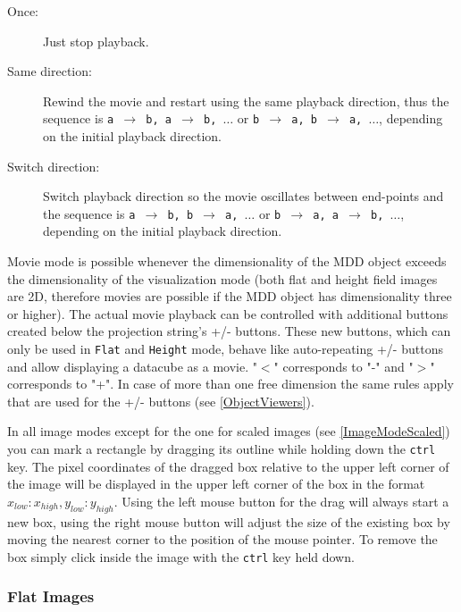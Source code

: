 \documentclass[11pt]{article}
\begin{document}
\begin{description}
\item[Once:] Just stop playback.
\item[Same direction:] Rewind the movie and restart using the same playback direction,
thus the sequence is \texttt{a $\rightarrow$ b, a $\rightarrow$ b, $\ldots$} or
\texttt{b $\rightarrow$ a, b $\rightarrow$ a, $\ldots$}, depending on the initial playback
direction.
\item[Switch direction:] Switch playback direction so the movie oscillates between
end-points and the sequence is \texttt{a $\rightarrow$ b, b $\rightarrow$ a, $\ldots$} or
\texttt{b $\rightarrow$ a, a $\rightarrow$ b, $\ldots$}, depending on the initial playback
direction.
\end{description}

Movie mode is possible whenever the dimensionality of the MDD object exceeds the
dimensionality of the visualization mode (both flat and height field images are 2D,
therefore movies are possible if the MDD object has dimensionality three or higher).
The actual movie playback can be controlled with additional buttons created below
the projection string's +/- buttons. These new buttons,
which can only be used in \texttt{Flat} and \texttt{Height} mode, behave like auto-repeating
+/- buttons and allow displaying a datacube as a movie. "$<$" corresponds to "-"
and "$>$" corresponds to "+". In case of more than one free dimension the same
rules apply that are used for the +/- buttons (see \ref{ObjectViewers}).

In all image modes except for the one for scaled images (see \ref{ImageModeScaled}) you
can mark a rectangle by dragging its outline while holding down the \texttt{ctrl} key.
The pixel coordinates of the dragged box relative to the upper left corner of the image
will be displayed in the upper left corner of the box in the format
$x_{low}:x_{high}, y_{low}:y_{high}$. Using the left mouse button for the
drag will always start a new box, using the right mouse button will adjust the size of
the existing box by moving the nearest corner to the position of the mouse pointer. To
remove the box simply click inside the image with the \texttt{ctrl} key held down.


\subsubsection{Flat Images} \label{ImageModeFlat}
\end{document}
